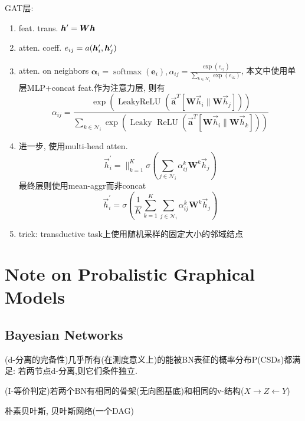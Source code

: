 \documentclass{article}
\begin{document}
    \begin{flushleft}
        GAT层:
        \begin{enumerate}
            \item feat. trans. $\boldsymbol{h}'=\boldsymbol{W}\boldsymbol{h}$
            \item atten. coeff. $e_{ij}=a(\boldsymbol{h}'_i, \boldsymbol{h}'_j)$
            \item atten. on neighbors $\bm \alpha_i = \operatorname{softmax}(\bm e_i), \alpha_{ij}=\frac{\exp \left(e_{i j}\right)}{\sum_{k \in \mathcal{N}_{i}} \exp \left(e_{i k}\right)}$, 本文中使用单层MLP+concat feat.作为注意力层, 则有
            \begin{equation}
                \alpha_{i j}=\frac{\exp \left(\text { LeakyReLU }\left(\overrightarrow{\mathbf{a}}^{T}\left[\mathbf{W} \vec{h}_{i} \| \mathbf{W} \vec{h}_{j}\right]\right)\right)}{\sum_{k \in \mathcal{N}_{i}} \exp \left(\text { Leaky } \operatorname{ReLU}\left(\overrightarrow{\mathbf{a}}^{T}\left[\mathbf{W} \vec{h}_{i} \| \mathbf{W} \vec{h}_{k}\right]\right)\right)}
            \end{equation}
            \item 进一步, 使用multi-head atten. 
            \begin{equation}
                \vec{h}_{i}^{\prime}=\|_{k=1}^{K} \sigma\left(\sum_{j \in \mathcal{N}_{i}} \alpha_{i j}^{k} \mathbf{W}^{k} \vec{h}_{j}\right)
            \end{equation}
            最终层则使用mean-aggr而非concat
            \begin{equation}
                \vec{h}_{i}^{\prime}=\sigma\left(\frac{1}{K} \sum_{k=1}^{K} \sum_{j \in \mathcal{N}_{i}} \alpha_{i j}^{k} \mathbf{W}^{k} \vec{h}_{j}\right)
            \end{equation}
            \item trick: transductive task上使用随机采样的固定大小的邻域结点
        \end{enumerate}
    \end{flushleft}

\section{Note on Probalistic Graphical Models}

\subsection{Bayesian Networks}

\begin{flushleft}
     (d-分离的完备性)几乎所有(在测度意义上)的能被BN表征的概率分布P(CSDs)都满足: 若两节点d-分离,则它们条件独立.

     (I-等价判定)若两个BN有相同的骨架(无向图基底)和相同的v-结构($X\to Z\leftarrow Y$)
    
    朴素贝叶斯, 贝叶斯网络(一个DAG)
\end{flushleft}
\end{document}
